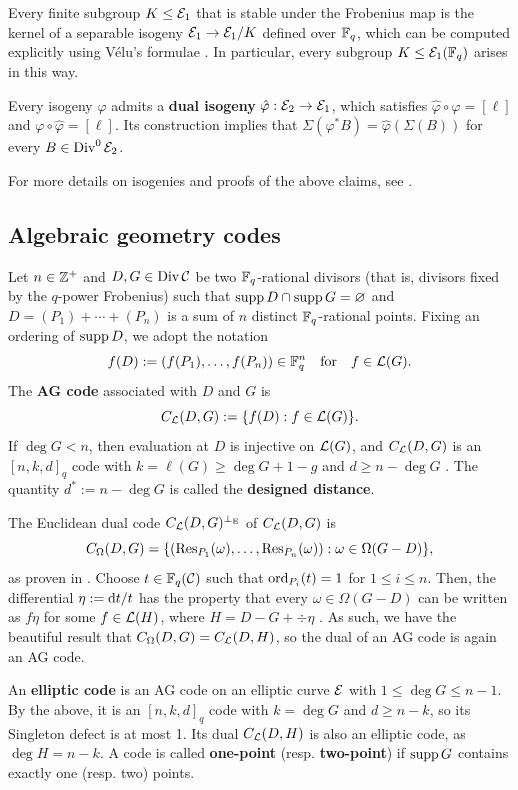 \documentclass[twocolumn, 11pt]{scrartcl}
\begin{document}
Every finite subgroup $K\leq\mathcal{E}_1$ that is stable under the Frobenius map is the kernel of a separable isogeny $\mathcal{E}_1\to\mathcal{E}_1/K$ defined over $\mathbb{F}_q$, which can be computed explicitly using V\'elu's formulae \cite{velu1971isogenies}. In particular, every subgroup $K\leq\mathcal{E}_1(\mathbb{F}_q)$ arises in this way.

Every isogeny $\varphi$ admits a \textbf{dual isogeny} $\hat\varphi:\mathcal{E}_2\to\mathcal{E}_1$, which satisfies $\hat\varphi\circ\varphi=[\ell]$ and $\varphi\circ\hat\varphi=[\ell]$. Its construction implies that $\Sigma(\varphi^*B)=\hat\varphi(\Sigma(B))$ for every $B\in\operatorname{Div}^0\mathcal{E}_2$.

For more details on isogenies and proofs of the above claims, see \cite[\S~III.4--6]{silverman2009arithmetic}.

\subsection{Algebraic geometry codes} \label{section:ecc}

Let $n\in\mathbb{Z}^+$ and $D,G\in\operatorname{Div}\mathcal{C}$ be two $\mathbb{F}_q$-rational divisors (that is, divisors fixed by the $q$-power Frobenius) such that $\operatorname{supp} D\cap\operatorname{supp} G=\varnothing$ and $D=(P_1)+\cdots+(P_n)$ is a sum of $n$ distinct $\mathbb{F}_q$-rational points. Fixing an ordering of $\operatorname{supp} D$, we adopt the notation
\[ f(D):=(f(P_1),\hdots,f(P_n))\in\mathbb{F}_q^n\quad\text{for}\quad f\in\mathcal{L}(G). \]
The \textbf{AG code} associated with $D$ and $G$ is
\[ C_\mathcal{L}(D,G):=\{f(D):f\in\mathcal{L}(G)\}. \]
If $\deg G<n$, then evaluation at $D$ is injective on $\mathcal{L}(G)$, and $C_\mathcal{L}(D,G)$ is an $[n,k,d]_q$ code with $k=\ell(G)\geq\deg G+1-g$ and $d\geq n-\deg G$ \cite[Thm.~2.2.2]{stichtenoth2009algebraic}. The quantity $d^*:=n-\deg G$ is called the \textbf{designed distance}.

The Euclidean dual code $C_\mathcal{L}(D,G)^{\perp_\mathrm{E}}$ of $C_\mathcal{L}(D,G)$ is
\[ C_\Omega(D,G)=\set*{(\Res_{P_1}(\omega),\hdots,\Res_{P_n}(\omega)):\omega\in\Omega(G-D)}, \]
as proven in \cite[Prop.~8]{o2008key}. Choose $t\in\mathbb{F}_q(\mathcal{C})$ such that $\operatorname{ord}_{P_i}(t)=1$ for $1\leq i\leq n$. Then, the differential $\eta:=\mathrm{d} t/t$ has the property that every $\omega\in\Omega(G-D)$ can be written as $f\eta$ for some $f\in\mathcal{L}(H)$, where $H=D-G+\div\eta$ \cite[\S8.1]{stichtenoth2009algebraic}. As such, we have the beautiful result that $C_\Omega(D,G)=C_\mathcal{L}(D,H)$, so the dual of an AG code is again an AG code.

An \textbf{elliptic code} is an AG code on an elliptic curve $\mathcal{E}$ with $1\leq\deg G\leq n-1$. By the above, it is an $[n,k,d]_q$ code with $k=\deg G$ and $d\geq n-k$, so its Singleton defect is at most 1. Its dual $C_\mathcal{L}(D,H)$ is also an elliptic code, as $\deg H=n-k$. A code is called \textbf{one-point} (resp. \textbf{two-point}) if $\operatorname{supp} G$ contains exactly one (resp. two) points.
\end{document}
